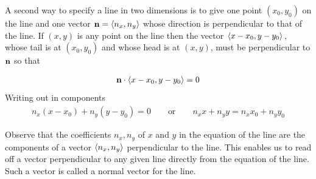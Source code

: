 A second way to specify a line in two dimensions is to give one point
$(x_0,y_0)$ on the line and one vector $\mathbf{n}=\left< n_x,n_y\right> $ whose 
direction is  perpendicular to that of the line.
%
If $(x,y)$ is any point on the line then the vector $\left< x-x_0,y-y_0\right> $, 
whose tail is at $(x_0,y_0)$ and whose head is at $(x,y)$,   
must be perpendicular to $\mathbf{n}$ so that
\begin{impeqn}\label{eqn line}
\begin{align*}
\mathbf{n}\cdot\left< x-x_0,y-y_0\right> =0
\end{align*}
Writing out in components
\begin{align*}
n_x(x-x_0)+n_y(y-y_0)=0\qquad\text{or}\qquad n_xx+n_yy= n_xx_0+n_yy_0
\end{align*}
\end{impeqn}\noindent
Observe that the coefficients $n_x,n_y$ of $x$ and $y$ in the equation
of the line are the components of a vector $\left< n_x,n_y\right> $ perpendicular 
to the line. This enables us to read off a vector perpendicular to any
given line directly from the equation of the line. Such a vector is called 
a normal vector for the line. 
